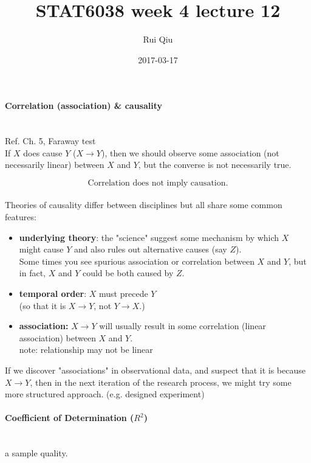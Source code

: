 \documentclass[a4paper, 11pt, twoside]{article}
\begin{document}
\title{STAT6038 week 4 lecture 12}
\author{Rui Qiu}
\date{2017-03-17}

\maketitle

\paragraph{Correlation (association) \& causality}\ \\

Ref. Ch. 5, Faraway test\\

If $X$ does cause $Y$ ($X\to Y$), then we should observe some association (not necessarily linear) between $X$ and $Y$, but the converse is not necessarily true.

\[\text{Correlation does not imply causation.}\]\\

Theories of causality differ between disciplines but all share some common features:

\begin{itemize}
	\item \textbf{underlying theory}: the "science" suggest some mechanism by which $X$ might cause $Y$ and also rules out alternative causes (say $Z$).\\
	Some times you see spurious association or correlation between $X$ and $Y$, but in fact, $X$ and $Y$ could be both caused by $Z$.
	\item \textbf{temporal order}: $X$ must precede $Y$\\
	(so that it is $X\to Y$, not $Y\to X$.)
	\item \textbf{association:} $X\to Y$ will usually result in some correlation (linear association) between $X$ and $Y$.\\
	note: relationship may not be linear
\end{itemize}

If we discover "associations" in observational data, and suspect that it is because $X\to Y$, then in the next iteration of the research process, we might try some more structured approach. (e.g. designed experiment)\\

\paragraph{Coefficient of Determination ($R^2$)}\ \\
a sample quality.
\end{document}
